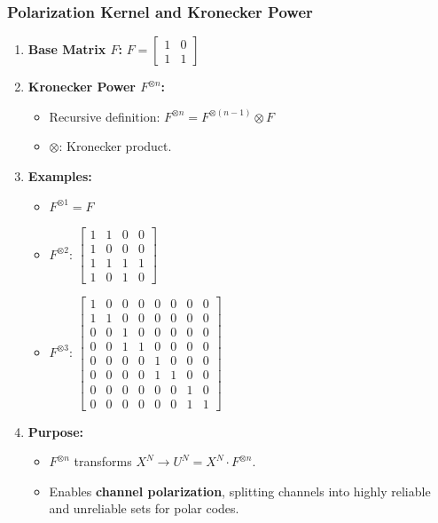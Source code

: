 \documentclass[11pt]{article}
\providecommand{\tightlist}{%
      \setlength{\itemsep}{0pt}\setlength{\parskip}{0pt}}
\begin{document}
    \subsubsection{Polarization Kernel and Kronecker
Power}\label{polarization-kernel-and-kronecker-power}

\begin{enumerate}
\def\labelenumi{\arabic{enumi}.}
\item
  \textbf{Base Matrix \(F\):}
  \(F = \begin{bmatrix} 1 & 0 \\ 1 & 1 \end{bmatrix}\)
\item
  \textbf{Kronecker Power \(F^{\otimes n}\):}

  \begin{itemize}
  \tightlist
  \item
    Recursive definition:
    \(F^{\otimes n} = F^{\otimes (n-1)} \otimes F\)
  \item
    \(\otimes\): Kronecker product.
  \end{itemize}
\item
  \textbf{Examples:}

  \begin{itemize}
  \tightlist
  \item
    \(F^{\otimes 1} = F\)
  \item
    \(F^{\otimes 2}\):
    \(\begin{bmatrix} 1 & 1 & 0 & 0 \\ 1 & 0 & 0 & 0 \\ 1 & 1 & 1 & 1 \\ 1 & 0 & 1 & 0 \end{bmatrix}\)
  \item
    \(F^{\otimes 3}\):
    \(\begin{bmatrix} 1 & 0 & 0 & 0 & 0 & 0 & 0 & 0 \\ 1 & 1 & 0 & 0 & 0 & 0 & 0 & 0 \\ 0 & 0 & 1 & 0 & 0 & 0 & 0 & 0 \\ 0 & 0 & 1 & 1 & 0 & 0 & 0 & 0 \\ 0 & 0 & 0 & 0 & 1 & 0 & 0 & 0 \\ 0 & 0 & 0 & 0 & 1 & 1 & 0 & 0 \\ 0 & 0 & 0 & 0 & 0 & 0 & 1 & 0 \\ 0 & 0 & 0 & 0 & 0 & 0 & 1 & 1 \end{bmatrix}\)
  \end{itemize}
\item
  \textbf{Purpose:}

  \begin{itemize}
  \tightlist
  \item
    \(F^{\otimes n}\) transforms
    \(X^N \to U^N = X^N \cdot F^{\otimes n}\).
  \item
    Enables \textbf{channel polarization}, splitting channels into
    highly reliable and unreliable sets for polar codes.
  \end{itemize}
\end{enumerate}
\end{document}
